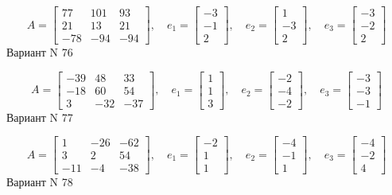 \documentclass[11pt]{report}
\begin{document}
$$A = \left[\begin{matrix}77 & 101 & 93\\21 & 13 & 21\\-78 & -94 & -94\end{matrix}\right],\quad e_1 = \left[\begin{matrix}-3\\-1\\2\end{matrix}\right],\quad e_2 = \left[\begin{matrix}1\\-3\\2\end{matrix}\right],\quad e_3 = \left[\begin{matrix}-3\\-2\\2\end{matrix}\right]$$Вариант N 76

$$A = \left[\begin{matrix}-39 & 48 & 33\\-18 & 60 & 54\\3 & -32 & -37\end{matrix}\right],\quad e_1 = \left[\begin{matrix}1\\1\\3\end{matrix}\right],\quad e_2 = \left[\begin{matrix}-2\\-4\\-2\end{matrix}\right],\quad e_3 = \left[\begin{matrix}-3\\-3\\-1\end{matrix}\right]$$Вариант N 77

$$A = \left[\begin{matrix}1 & -26 & -62\\3 & 2 & 54\\-11 & -4 & -38\end{matrix}\right],\quad e_1 = \left[\begin{matrix}-2\\1\\1\end{matrix}\right],\quad e_2 = \left[\begin{matrix}-4\\-1\\1\end{matrix}\right],\quad e_3 = \left[\begin{matrix}-4\\-2\\4\end{matrix}\right]$$Вариант N 78
\end{document}
